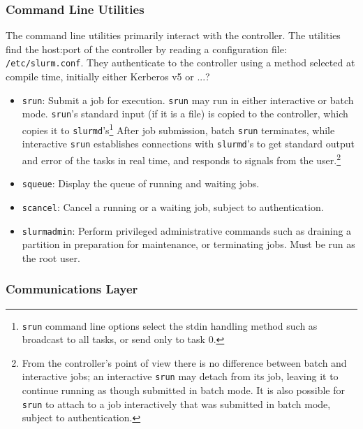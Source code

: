 \subsubsection{Command Line Utilities}

The command line utilities primarily interact with the controller.
The utilities find the host:port of the controller by reading a configuration 
file: {\tt /etc/slurm.conf}.
They authenticate to the controller using a method selected at compile
time, initially either Kerberos v5 or ...?


\begin{itemize}
\item {\tt srun}: Submit a job for execution.  {\tt srun} may run in either
interactive or batch mode.  {\tt srun}'s standard input (if it is a file) is 
copied to the controller, which copies it to {\tt slurmd}'s\footnote{{\tt srun}
command line options select the stdin handling method such as broadcast to 
all tasks, or send only to task 0.}
After job submission, batch {\tt srun} terminates, while interactive 
{\tt srun} establishes connections with {\tt slurmd}'s to get standard output 
and error of the tasks in real time, and responds to signals from the 
user.\footnote{From the controller's point of view there is no difference 
between batch and interactive jobs;  an interactive {\tt srun} may detach from 
its job, leaving it to continue running as though submitted in batch mode.
It is also possible for {\tt srun} to attach to a job interactively that
was submitted in batch mode, subject to authentication.}

\item {\tt squeue}: Display the queue of running and waiting jobs.

\item {\tt scancel}: Cancel a running or a waiting job, subject to
authentication.

\item {\tt slurmadmin}: Perform privileged administrative commands
such as draining a partition in preparation for maintenance, or terminating
jobs.  Must be run as the root user.

\end{itemize}

\subsubsection{Communications Layer}

